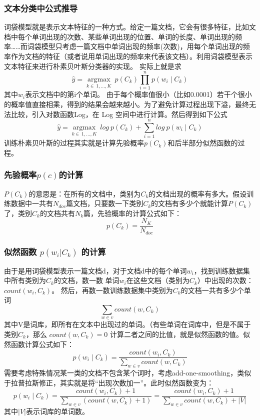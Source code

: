 \documentclass[lang=cn,11pt]{elegantpaper}
\begin{document}
\subsubsection{文本分类中公式推导}
词袋模型就是表示文本特征的一种方式。给定一篇文档，它会有很多特征，比如文档中每个单词出现的次数、某些单词出现的位置、单词的长度、单词出现的频率……而词袋模型只考虑一篇文档中单词出现的频率(次数)，用每个单词出现的频率作为文档的特征（或者说用单词出现的频率来代表该文档）。利用词袋模型表示文本特征来进行朴素贝叶斯分类器的实现。
实际上就是求
$$\hat{y} = {\underset {k \in \ {1,\dots,K}} {\operatorname {argmax}}} \ p(C_ {k})\prod_{i = 1} ^ {n} p(w_ {i} \mid C_ {k})$$
其中$w_i$表示文档中的第i个单词。
由于每个概率值很小（比如0.0001）若干个很小的概率值直接相乘，得到的结果会越来越小。为了避免计算过程出现下溢，最终无法比较，引入对数函数Log，在 Log 空间中进行计算。然后得到如下公式
$$\hat{y} = {\underset {k \in \ {1,\dots,K}} {\operatorname {argmax}}} \ log \ p(C_ {k}) + \sum_{i = 1} ^ {n} log \ p(w_ {i} \mid C_ {k})$$
训练朴素贝叶斯的过程其实就是计算先验概率$p(C_k)​$和后半部分似然函数的过程。

\subsubsection{先验概率$p(c)$的计算}
$P(C_k)$的意思是：在所有的文档中，类别为$C_{k}$的文档出现的概率有多大。假设训练数据中一共有$N_{doc}$篇文档，只要数一下类别$C_{k}$的文档有多少个就能计算$P(C_k)$了，类别$C_{k}$的文档共有$N_k$篇，先验概率的计算公式如下：
$$p(C_k)=\frac{N_K}{N_{doc}}$$

\subsubsection{似然函数 $p(w_i|C_k)$ 的计算}
由于是用词袋模型表示一篇文档d，对于文档d中的每个单词$w_i$，找到训练数据集中所有类别为$C_{k}$的文档，数一数 单词$w_i$在这些文档（类别为$C_{k}$）中出现的次数：$count(w_{i},C_{k})$。
然后，再数一数训练数据集中类别为$C_{k}​$的文档一共有多少个单词
$$\sum_{w \in v}count(w, C_{k})$$
其中V是词库，即所有在文本中出现过的单词。（有些单词在词库中，但是不属于类别$C_{k}$，那么 $count(w, C_{k}) = 0​$
计算二者之间的比值，就是似然函数的值。似然函数计算公式如下：
$$p(w_ {i} \mid C_ {k})=\frac{count(w_i, C_k)}{\sum_{w \in v}count(w, C_{k})}$$
需要考虑特殊情况某一类的文档不包含某个词时，考虑add-one-smoothing，类似于拉普拉斯修正，其实就是将“出现次数加一”。此时似然函数变为：
$$p(w_ {i} \mid C_ {k})=\frac{count(w_i, C_k)+1}{\sum_{w \in v}(count(w, C_{k})+1)}=\frac{count(w_i, C_k)+1}{\sum_{w \in v}count(w, C_{k})+|V|}$$
其中$|V|$表示词库的单词数。
\end{document}
